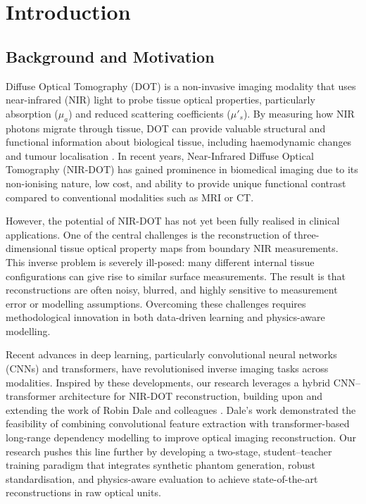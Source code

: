 
\chapter{Introduction}

\section{Background and Motivation}

Diffuse Optical Tomography (DOT) is a non-invasive imaging modality that uses near-infrared (NIR) light to probe tissue optical properties, particularly absorption ($\mu_a$) and reduced scattering coefficients ($\mu'_s$). By measuring how NIR photons migrate through tissue, DOT can provide valuable structural and functional information about biological tissue, including haemodynamic changes and tumour localisation \cite{dale2021, dale2022}. In recent years, Near-Infrared Diffuse Optical Tomography (NIR-DOT) has gained prominence in biomedical imaging due to its non-ionising nature, low cost, and ability to provide unique functional contrast compared to conventional modalities such as MRI or CT.

However, the potential of NIR-DOT has not yet been fully realised in clinical applications. One of the central challenges is the reconstruction of three-dimensional tissue optical property maps from boundary NIR measurements. This inverse problem is severely ill-posed: many different internal tissue configurations can give rise to similar surface measurements. The result is that reconstructions are often noisy, blurred, and highly sensitive to measurement error or modelling assumptions. Overcoming these challenges requires methodological innovation in both data-driven learning and physics-aware modelling.

Recent advances in deep learning, particularly convolutional neural networks (CNNs) and transformers, have revolutionised inverse imaging tasks across modalities. Inspired by these developments, our research leverages a hybrid CNN–transformer architecture for NIR-DOT reconstruction, building upon and extending the work of Robin Dale and colleagues \cite{dale2023hybrid}. Dale’s work demonstrated the feasibility of combining convolutional feature extraction with transformer-based long-range dependency modelling to improve optical imaging reconstruction. Our research pushes this line further by developing a two-stage, student–teacher training paradigm that integrates synthetic phantom generation, robust standardisation, and physics-aware evaluation to achieve state-of-the-art reconstructions in raw optical units.

